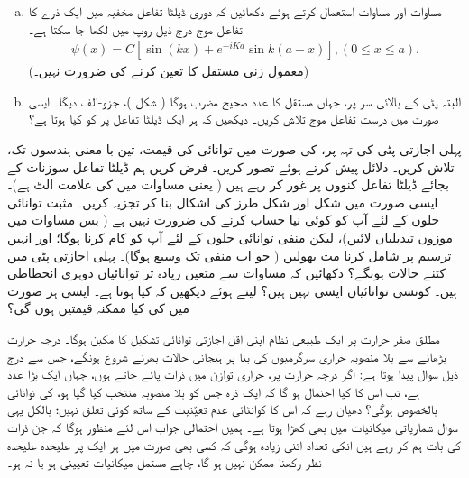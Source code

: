 \begin{enumerate}[a.]
\item
 مساوات  اور مساوات  استعمال کرتے ہوئے دکھائیں کہ دوری ڈیلٹا تفاعل مخفیہ میں ایک ذرے کا تفاعل موج درج ذیل روپ میں لکھا جا سکتا ہے۔
\begin{align*}
	\psi(x) = C[\sin(kx)+e^{-iKa}\sin k(a-x)], (0\leq x\leq a).
\end{align*} 
(معمول زنی مستقل  کا تعین کرنے کی ضرورت نہیں۔)
\item
 البتہ پٹی کے بالائی سر پر، جہاں  مستقل  کا عدد صحیح مضرب ہوگا ( شکل )، جزو-الف  دیگا۔ ایسی صورت میں درست تفاعل موج تلاش کریں۔ دیکھیں کہ ہر ایک ڈیلٹا تفاعل پر  کو کیا ہوتا ہے؟
\end{enumerate}
پہلی اجازتی پٹی کی تہہ پر،  کی صورت میں توانائی کی قیمت، تین با معنی ہندسوں تک، تلاش کریں۔ دلائل پیش کرتے ہوئے  تصور کریں۔
فرض کریں ہم ڈیلٹا تفاعل سوزنات کے بجائے ڈیلٹا تفاعل کنووں پر غور کر رہے ہیں ( یعنی مساوات  میں  کی علامت الٹ ہے)۔ ایسی صورت میں
 شکل  اور شکل  طرز کی اشکال بنا کر تجزیہ کریں۔ مثبت توانائی حلوں کے لئے آپ کو کوئی نیا حساب کرنے کی ضرورت نہیں ہے ( بس مساوات  میں موزوں تبدیلیاں لائیں)، لیکن منفی توانائی حلوں کے لئے آپ کو کام کرنا ہوگا؛ اور انہیں ترسیم پر شامل کرنا مت بھولیں ( جو اب منفی  تک وسیع ہوگا)۔ پہلی اجازتی پٹی میں کتنے حالات ہونگے؟
دکھائیں کہ مساوات  سے متعین زیادہ تر توانائیاں دوہری انحطاطی ہیں۔ کونسی توانائیاں ایسی نہیں ہیں؟   لیتے ہوئے دیکھیں کہ کیا ہوتا ہے۔ ایسی ہر صورت میں  کی کیا ممکنہ قیمتیں ہوں گی؟


مطلق صفر حرارت پر ایک طبیعی نظام اپنی اقل اجازتی توانائی تشکیل کا مکین ہوگا۔ درجہ حرارت بڑھانے سے بلا منصوبہ حراری سرگرمیوں کی بنا پر ہیجانی حالات بھرنے شروع ہونگے، جس سے درج ذیل سوال پیدا ہوتا ہے: اگر درجہ حرارت  پر، حراری توازن میں  ذرات پائے جاتے ہوں، جہاں  ایک بڑا عدد ہے، تب اس کا کیا احتمال ہو گا کہ ایک ذرہ جس کو بلا منصوبہ منتخب کیا گیا ہو، کی توانائی بالخصوص  ہوگی؟ دھیان رہے کہ اس کا کوانٹائی عدم تعیّنیت کے ساتھ کوئی تعلق نہیں؛ بالکل یہی سوال  شماریاتی میکانیات میں بھی کھڑا ہوتا ہے۔ ہمیں احتمالی جواب اس لئے منظور ہوگا کہ جن ذرات کی بات ہم کر رہے ہیں انکی تعداد اتنی زیادہ ہوگی کہ کسی بھی صورت میں ہر ایک پر علیحدہ علیحدہ نظر رکھنا ممکن نہیں ہو گا، چاہے مستمل میکانیات تعیینی ہو یا نہ ہو۔

